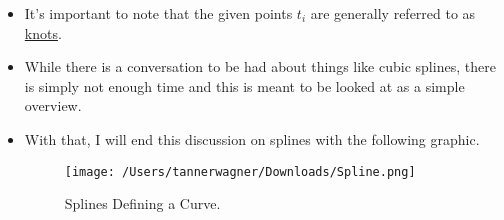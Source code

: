 \documentclass{article}
\begin{document}
\begin{itemize}
\item It's important to note that the given points $t_i$ are generally referred to as \underline{knots}.
\item While there is a conversation to be had about things like cubic splines, there is simply not enough time and this is meant to be looked at as a simple overview.
\item With that, I will end this discussion on splines with the following graphic.
\begin{figure}[H]
\centering
\texttt{[image: /Users/tannerwagner/Downloads/Spline.png]}
\caption[Short caption]{Splines Defining a Curve.}
\end{figure}
\end{itemize}
\end{document}
